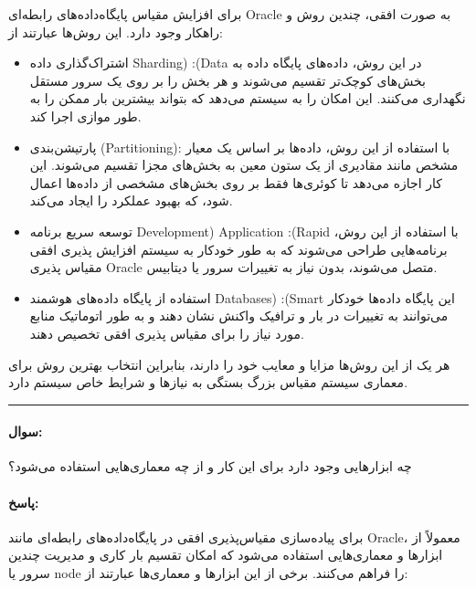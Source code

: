 \documentclass[a4paper,10pt]{article}
\begin{document}
    برای افزایش مقیاس پایگاه‌داده‌های رابطه‌ای Oracle به صورت افقی، چندین روش و راهکار وجود دارد. این روش‌ها عبارتند از:

    \begin{itemize}

        \item اشتراک‌گذاری داده Sharding) :(Data در این روش، داده‌های پایگاه داده به بخش‌های کوچک‌تر تقسیم می‌شوند و هر بخش را بر روی یک سرور مستقل نگهداری می‌کنند. این امکان را به سیستم می‌دهد که بتواند بیشترین بار ممکن را به طور موازی اجرا کند.

        \item پارتیشن‌بندی (Partitioning): با استفاده از این روش، داده‌ها بر اساس یک معیار مشخص مانند مقادیری از یک ستون معین به بخش‌های مجزا تقسیم می‌شوند. این کار اجازه می‌دهد تا کوئری‌ها فقط بر روی بخش‌های مشخصی از داده‌ها اعمال شود، که بهبود عملکرد را ایجاد می‌کند.

        \item توسعه سریع برنامه Development) Application :(Rapid با استفاده از این روش، برنامه‌هایی طراحی می‌شوند که به طور خودکار به سیستم افزایش پذیری افقی مقیاس پذیری Oracle متصل می‌شوند، بدون نیاز به تغییرات سرور یا دیتابیس.

        \item استفاده از پایگاه داده‌های هوشمند Databases) :(Smart این پایگاه داده‌ها خودکار می‌توانند به تغییرات در بار و ترافیک واکنش نشان دهند و به طور اتوماتیک منابع مورد نیاز را برای مقیاس پذیری افقی تخصیص دهند.

    \end{itemize}

    هر یک از این روش‌ها مزایا و معایب خود را دارند، بنابراین انتخاب بهترین روش برای معماری سیستم مقیاس بزرگ بستگی به نیازها و شرایط خاص سیستم دارد.

    \noindent\hrule

    \paragraph{سوال:} چه ابزارهایی وجود دارد برای این کار و از چه معماری‌هایی استفاده می‌شود؟

    \paragraph{پاسخ:} برای پیاده‌سازی مقیاس‌پذیری افقی در پایگاه‌داده‌های رابطه‌ای مانند Oracle، معمولاً از ابزارها و معماری‌هایی استفاده می‌شود که امکان تقسیم بار کاری و مدیریت چندین سرور یا node را فراهم می‌کنند. برخی از این ابزارها و معماری‌ها عبارتند از:
\end{document}
